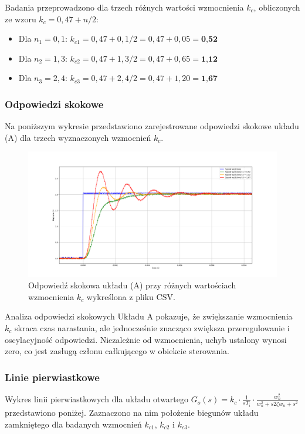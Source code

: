 \documentclass[12pt,a4paper]{article}
\begin{document}
	Badania przeprowadzono dla trzech różnych wartości wzmocnienia \(k_c\), obliczonych ze wzoru \(k_c = 0,47 + n/2\):
	\begin{itemize}
		\item Dla \(n_1 = 0,1\): $k_{c1} = 0,47 + 0,1 / 2 = 0,47 + 0,05 = \textbf{0,52}$
		\item Dla \(n_2 = 1,3\): $k_{c2} = 0,47 + 1,3 / 2 = 0,47 + 0,65 = \textbf{1,12}$
		\item Dla \(n_3 = 2,4\): $k_{c3} = 0,47 + 2,4 / 2 = 0,47 + 1,20 = \textbf{1,67}$
	\end{itemize}
	
	\subsubsection{Odpowiedzi skokowe}
	Na poniższym wykresie przedstawiono zarejestrowane odpowiedzi skokowe układu (A) dla trzech wyznaczonych wzmocnień \(k_c\).
	
	\begin{figure}[H]
		\centering
		\includegraphics[width=1\linewidth]{zdjecia/OdpSkokA.png}
		\caption{Odpowiedź skokowa układu (A) przy różnych wartościach wzmocnienia \(k_c\) wykreślona z pliku CSV.}
		\label{fig:OdpSkokA}
	\end{figure}
	
	Analiza odpowiedzi skokowych Układu A pokazuje, że zwiększanie wzmocnienia $k_c$ skraca czas narastania, ale jednocześnie znacząco zwiększa przeregulowanie i oscylacyjność odpowiedzi. Niezależnie od wzmocnienia, uchyb ustalony wynosi zero, co jest zasługą członu całkującego w obiekcie sterowania.
	
	\subsubsection{Linie pierwiastkowe}
	Wykres linii pierwiastkowych dla układu otwartego \(G_o(s) = k_c \cdot \frac{1}{sT_i} \cdot \frac{w_n^2}{w_n^2 + s 2 \zeta w_n + s^2}\) przedstawiono poniżej. Zaznaczono na nim położenie biegunów układu zamkniętego dla badanych wzmocnień \(k_{c1}\), \(k_{c2}\) i \(k_{c3}\).
	
\end{document}
